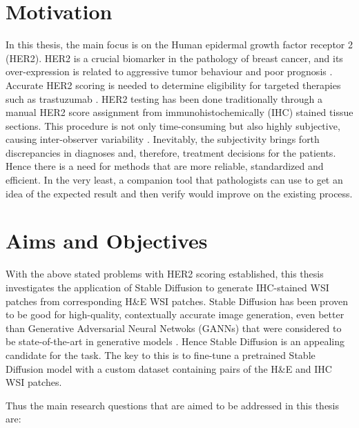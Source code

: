\section{Motivation}

In this thesis, the main focus is on the Human epidermal growth factor receptor 2 (HER2). HER2 is a crucial biomarker in the pathology of breast cancer, and its over-expression is related to aggressive tumor behaviour and poor prognosis \parencite{Slamon1987HumanOncogene}. Accurate HER2 scoring is needed to determine eligibility for targeted therapies such as trastuzumab \parencite{Slamon2001UseHER2}. HER2 testing has been done traditionally through a manual HER2 score assignment from immunohistochemically (IHC) stained tissue sections. This procedure is not only time-consuming but also highly subjective, causing inter-observer variability \parencite{Wolff2013RecommendationsUpdate.}. Inevitably, the subjectivity brings forth discrepancies in diagnoses and, therefore, treatment decisions for the patients. Hence there is a need for methods that are more reliable, standardized and efficient. In the very least, a companion tool that pathologists can use to get an idea of the expected result and then verify would improve on the existing process. 

\section{Aims and Objectives} 

With the above stated problems with HER2 scoring established, this thesis investigates the application of Stable Diffusion \parencite{Rombach2021High-ResolutionModels} to generate IHC-stained WSI patches from corresponding H\&E WSI patches. Stable Diffusion has been proven to be good for high-quality, contextually accurate image generation, even better than Generative Adversarial Neural Netwoks (GANNs) that were considered to be state-of-the-art in generative models \parencite{Baranchuk2021Label-EfficientModels}. Hence Stable Diffusion is an appealing candidate for the task. The key to this is to fine-tune a pretrained Stable Diffusion model with a custom dataset containing pairs of the H\&E and IHC WSI patches. 

\vspace{5 mm}

Thus the main research questions that are aimed to be addressed in this thesis are:

